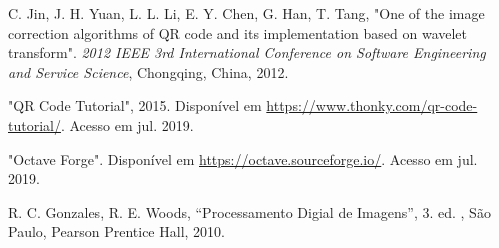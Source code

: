 \documentclass{ceel}
\begin{document}
\begin{multicols}{2}
\begin{thebibliography}{9}
C. Jin, J. H. Yuan, L. L. Li, E. Y. Chen, G. Han, T. Tang, 
"One of the image correction algorithms of QR code and its implementation
based on wavelet transform".
\emph{2012 IEEE 3rd International Conference on
Software Engineering and Service Science}, Chongqing, China, 2012.


	"QR Code Tutorial", 2015.
	Disponível em \url{https://www.thonky.com/qr-code-tutorial/}. Acesso em jul. 2019.

"Octave Forge". 
Disponível em \url{https://octave.sourceforge.io/}. Acesso em jul. 2019.

    R. C. Gonzales, R. E. Woods,
    “Processamento Digial de Imagens”, 
    3. ed. , São Paulo, Pearson Prentice Hall, 2010.

\end{thebibliography}


\end{multicols}
\end{document}
